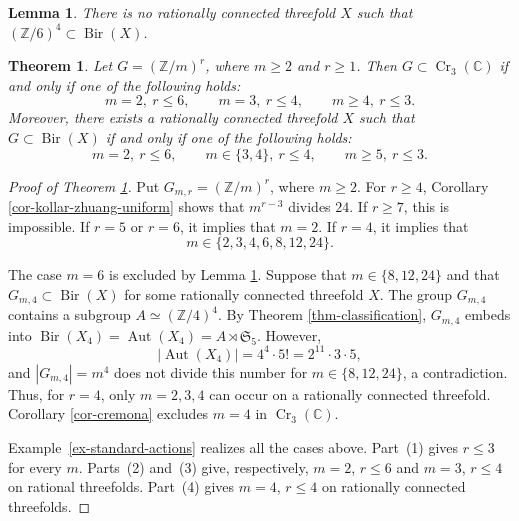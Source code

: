 \documentclass[10pt,a4paper]{amsart}
\newtheorem{theorem}{Theorem}
\newtheorem{lemma}{Lemma}
\newcommand{\C}{\mathbb C}
\newcommand{\Cr}{\operatorname{Cr}}
\newcommand{\Z}{\mathbb Z}
\begin{document}
\begin{lemma}
\label{lem-no-six-four}
There is no rationally connected threefold $X$ such that
$(\Z/6)^4\subset\operatorname{Bir}(X)$.
\end{lemma}

\begin{theorem}
\label{thm-sharp-bounds}
Let $G=(\Z/m)^r$, where $m\geq2$ and $r\geq1$.  Then
$G\subset\Cr_3(\C)$ if and only if one of the following holds:
\[
 m=2,\ r\leq6,\quad\quad
 m=3,\ r\leq4,\quad\quad
 m\geq4,\ r\leq3.
\]
Moreover, there exists a rationally connected threefold $X$ such that
$G\subset\operatorname{Bir}(X)$ if and only if one of the following
holds:
\[
 m=2,\ r\leq6,\quad\quad
 m\in\{3,4\},\ r\leq4,\quad\quad
 m\geq5,\ r\leq3.
\]
\end{theorem}

\begin{proof}[Proof of Theorem \ref{thm-sharp-bounds}]
Put $G_{m,r}=(\Z/m)^r$, where $m\geq2$.  For $r\geq4$, Corollary
\ref{cor-kollar-zhuang-uniform} shows that $m^{r-3}$ divides $24$.
If $r\geq7$, this is impossible.  If $r=5$ or $r=6$, it implies that
$m=2$.  If $r=4$, it implies that
\[
 m\in\{2,3,4,6,8,12,24\}.
\]

The case $m=6$ is excluded by Lemma \ref{lem-no-six-four}.  Suppose
that $m\in\{8,12,24\}$ and that
$G_{m,4}\subset\operatorname{Bir}(X)$ for some rationally connected
threefold $X$.  The group $G_{m,4}$ contains a subgroup
$A\simeq(\Z/4)^4$.  By Theorem \ref{thm-classification},
$G_{m,4}$ embeds into
$\operatorname{Bir}(X_4)=\operatorname{Aut}(X_4)
=A\rtimes\mathfrak S_5$.
However,
\[
 |\operatorname{Aut}(X_4)|=4^4\cdot5!=2^{11}\cdot3\cdot5,
\]
and $|G_{m,4}|=m^4$ does not divide this number for
$m\in\{8,12,24\}$, a contradiction.  Thus,
for $r=4$, only $m=2,3,4$ can occur on a rationally connected
threefold.  Corollary \ref{cor-cremona} excludes $m=4$ in
$\Cr_3(\C)$.

Example~\ref{ex-standard-actions} realizes all the cases above.
Part~(1) gives $r\leq3$ for every $m$. Parts~(2) and~(3) give,
respectively, $m=2$, $r\leq6$ and $m=3$, $r\leq4$ on rational
threefolds. Part~(4) gives $m=4$, $r\leq4$ on rationally
connected threefolds.
\end{proof}
\end{document}
